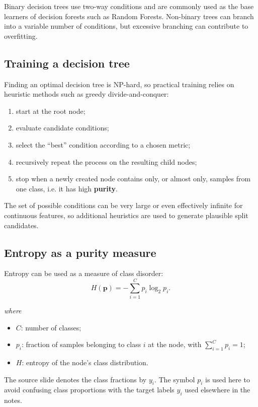 \documentclass[11pt,a4paper]{report}
\newcommand{\vect}[1]{\bm{#1}}
\newcommand{\wherelegend}{\par\smallskip\textit{where}\vspace{-0.3em}}
\begin{document}
Binary decision trees use two-way conditions and are commonly used as the base learners of decision forests such as Random Forests. Non-binary trees can branch into a variable number of conditions, but excessive branching can contribute to overfitting.

\subsection{Training a decision tree}

Finding an optimal decision tree is NP-hard, so practical training relies on heuristic methods such as greedy divide-and-conquer:
\begin{enumerate}
  \item start at the root node;
  \item evaluate candidate conditions;
  \item select the ``best'' condition according to a chosen metric;
  \item recursively repeat the process on the resulting child nodes;
  \item stop when a newly created node contains only, or almost only, samples from one class, i.e. it has high \textbf{purity}.
\end{enumerate}

The set of possible conditions can be very large or even effectively infinite for continuous features, so additional heuristics are used to generate plausible split candidates.

\subsection{Entropy as a purity measure}

Entropy can be used as a measure of class disorder:
\begin{equation}
  H(\vect{p}) = -\sum_{i=1}^{C} p_i\log_2 p_i.
  \label{eq:entropy}
\end{equation}
\wherelegend
\begin{itemize}
  \item $C$: number of classes;
  \item $p_i$: fraction of samples belonging to class $i$ at the node, with $\sum_{i=1}^{C}p_i=1$;
  \item $H$: entropy of the node's class distribution.
\end{itemize}
\begin{notationbox}
The source slide denotes the class fractions by $y_i$. The symbol $p_i$ is used here to avoid confusing class proportions with the target labels $y_i$ used elsewhere in the notes.
\end{notationbox}
\end{document}
